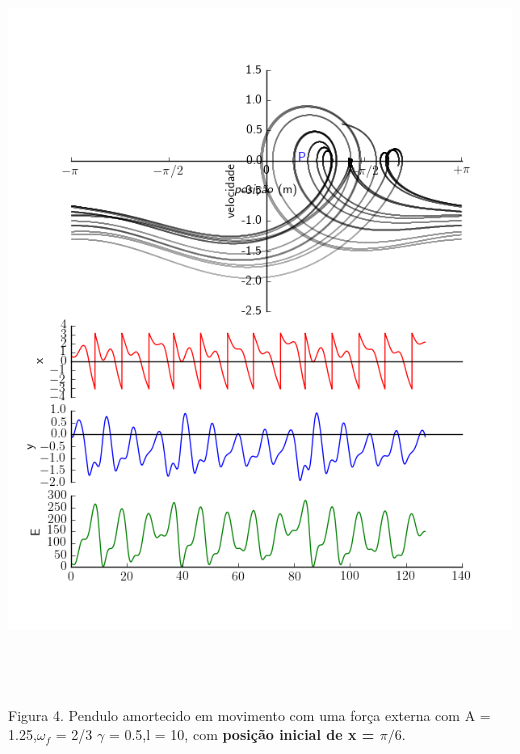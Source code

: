 \documentclass[dvipsnames,a4paper,11pt]{article}
\begin{document}
\begin{center}
	\includegraphics[width=6.24in,height=7.68in,keepaspectratio = false]{image3.png}
	
	\scriptsize Figura 4. Pendulo amortecido em movimento com uma força externa com A = 1.25,$\omega_f$ = 2/3 $\gamma$ = 0.5,l = 10, com \textbf{posição inicial de x = $\pi/6$}. 
	
\end{center}
\end{document}
